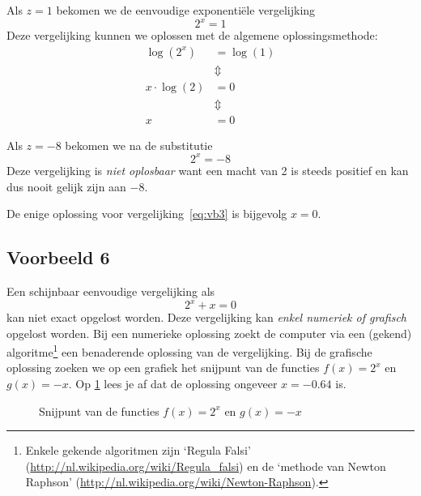 Als $z=1$ bekomen we de eenvoudige exponenti\"ele vergelijking
\[
 2^{x}  =  1
\]
Deze vergelijking kunnen we oplossen met de algemene oplossingsmethode:
\begin{align*}
    \log\left(2^x\right) &=  \log(1) \\
     &\Updownarrow  \\
    x\cdot \log(2) &= 0 \\
     &\Updownarrow  \\
    x &=  0
\end{align*}

Als $z=-8$ bekomen we na de substitutie
 \begin{displaymath}
    2^{x} = -8  
    \end{displaymath}
    Deze  vergelijking is \emph{niet oplosbaar} want een macht van 2 is steeds positief en kan dus nooit gelijk zijn aan $-8$. 
    
   De enige oplossing voor vergelijking~\eqref{eq:vb3} is bijgevolg $x=0$.

    \subsection{Voorbeeld 6}
    Een schijnbaar eenvoudige vergelijking als
    \begin{displaymath}
        2^{x}+x = 0
    \end{displaymath}
      kan niet exact opgelost worden. Deze
      vergelijking kan \emph{enkel numeriek of grafisch} opgelost worden.
      Bij een numerieke oplossing zoekt de computer via een (gekend) algoritme\footnote{Enkele gekende algoritmen zijn `Regula Falsi' (\url{http://nl.wikipedia.org/wiki/Regula\_falsi}) en de `methode van Newton Raphson' (\url{http://nl.wikipedia.org/wiki/Newton-Raphson}).} een benaderende oplossing van de vergelijking. 
      Bij de grafische oplossing zoeken we op een grafiek het snijpunt van de functies $f(x)=2^x$ en $g(x)=-x$.
      Op \cref{fig:snijp3} lees je af dat de oplossing ongeveer $x=\num{-0.64}$ is.
\begin{figure}[htbp]
  \centering
  \caption{Snijpunt van de functies $f(x)=2^x$ en $g(x)=-x$}
  \label{fig:snijp3}
\end{figure}


